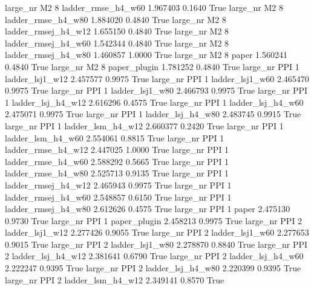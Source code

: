   large_nr       M2                 8  ladder_rmse_h4_w60   1.967403      0.1640    True
  large_nr       M2                 8  ladder_rmse_h4_w80   1.884020      0.4840    True
  large_nr       M2                 8 ladder_rmsej_h4_w12   1.655150      0.4840    True
  large_nr       M2                 8 ladder_rmsej_h4_w60   1.542344      0.4840    True
  large_nr       M2                 8 ladder_rmsej_h4_w80   1.460857      1.0000    True
  large_nr       M2                 8               paper   1.560241      0.4840    True
  large_nr       M2                 8        paper_plugin   1.781252      0.4840    True
  large_nr      PPI                 1     ladder_lsj1_w12   2.457577      0.9975    True
  large_nr      PPI                 1     ladder_lsj1_w60   2.465470      0.9975    True
  large_nr      PPI                 1     ladder_lsj1_w80   2.466793      0.9975    True
  large_nr      PPI                 1   ladder_lsj_h4_w12   2.616296      0.4575    True
  large_nr      PPI                 1   ladder_lsj_h4_w60   2.475071      0.9975    True
  large_nr      PPI                 1   ladder_lsj_h4_w80   2.483745      0.9915    True
  large_nr      PPI                 1   ladder_lsm_h4_w12   2.660377      0.2420    True
  large_nr      PPI                 1   ladder_lsm_h4_w60   2.554061      0.8815    True
  large_nr      PPI                 1  ladder_rmse_h4_w12   2.447025      1.0000    True
  large_nr      PPI                 1  ladder_rmse_h4_w60   2.588292      0.5665    True
  large_nr      PPI                 1  ladder_rmse_h4_w80   2.525713      0.9135    True
  large_nr      PPI                 1 ladder_rmsej_h4_w12   2.465943      0.9975    True
  large_nr      PPI                 1 ladder_rmsej_h4_w60   2.548857      0.6150    True
  large_nr      PPI                 1 ladder_rmsej_h4_w80   2.612626      0.4575    True
  large_nr      PPI                 1               paper   2.475130      0.9730    True
  large_nr      PPI                 1        paper_plugin   2.458213      0.9975    True
  large_nr      PPI                 2     ladder_lsj1_w12   2.277426      0.9055    True
  large_nr      PPI                 2     ladder_lsj1_w60   2.277653      0.9015    True
  large_nr      PPI                 2     ladder_lsj1_w80   2.278870      0.8840    True
  large_nr      PPI                 2   ladder_lsj_h4_w12   2.381641      0.6790    True
  large_nr      PPI                 2   ladder_lsj_h4_w60   2.222247      0.9395    True
  large_nr      PPI                 2   ladder_lsj_h4_w80   2.220399      0.9395    True
  large_nr      PPI                 2   ladder_lsm_h4_w12   2.349141      0.8570    True
